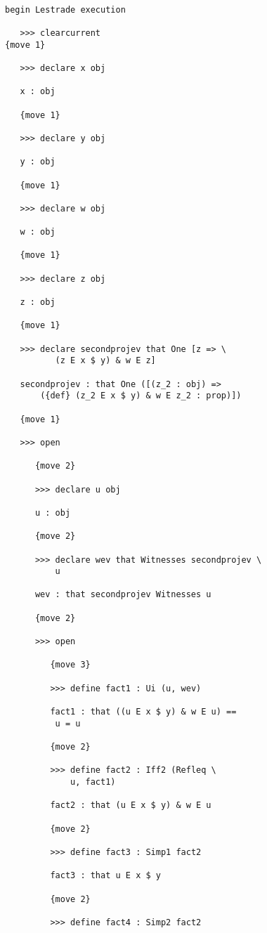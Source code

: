 \documentclass[12pt]{article}
\begin{document}
\begin{verbatim}

begin Lestrade execution

   >>> clearcurrent
{move 1}

   >>> declare x obj

   x : obj

   {move 1}

   >>> declare y obj

   y : obj

   {move 1}

   >>> declare w obj

   w : obj

   {move 1}

   >>> declare z obj

   z : obj

   {move 1}

   >>> declare secondprojev that One [z => \
          (z E x $ y) & w E z]

   secondprojev : that One ([(z_2 : obj) => 
       ({def} (z_2 E x $ y) & w E z_2 : prop)])

   {move 1}

   >>> open

      {move 2}

      >>> declare u obj

      u : obj

      {move 2}

      >>> declare wev that Witnesses secondprojev \
          u

      wev : that secondprojev Witnesses u

      {move 2}

      >>> open

         {move 3}

         >>> define fact1 : Ui (u, wev)

         fact1 : that ((u E x $ y) & w E u) == 
          u = u

         {move 2}

         >>> define fact2 : Iff2 (Refleq \
             u, fact1)

         fact2 : that (u E x $ y) & w E u

         {move 2}

         >>> define fact3 : Simp1 fact2

         fact3 : that u E x $ y

         {move 2}

         >>> define fact4 : Simp2 fact2


\end{verbatim}
\end{document}
